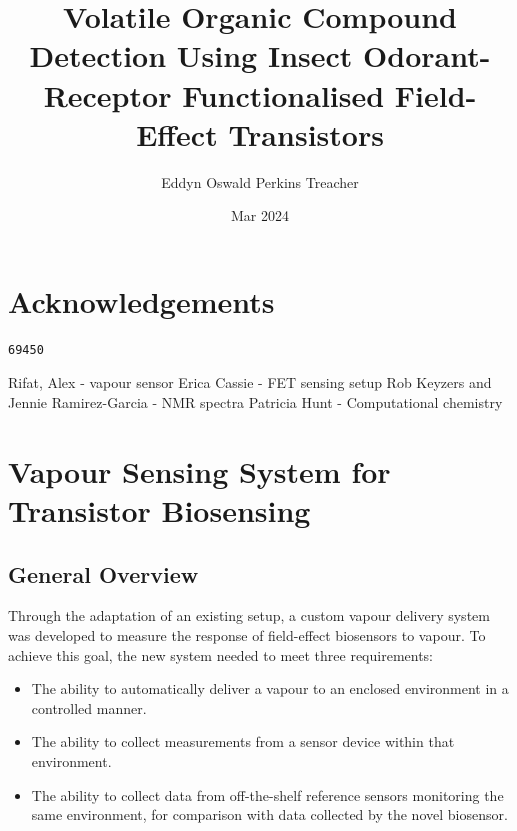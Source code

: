 \documentclass[
  a4paper,
]{scrbook}
\title{Volatile Organic Compound Detection Using Insect Odorant-Receptor
Functionalised Field-Effect Transistors}
\author{Eddyn Oswald Perkins Treacher}
\date{Mar 2024}
\renewcommand*\contentsname{Table of contents}
\newcommand\contentsname{Table of contents}
\begin{document}
\frontmatter
\maketitle
\ifdefined\Shaded\renewenvironment{Shaded}{\begin{tcolorbox}[borderline west={3pt}{0pt}{shadecolor}, sharp corners, enhanced, interior hidden, breakable, boxrule=0pt, frame hidden]}{\end{tcolorbox}}\fi

\renewcommand*\contentsname{Table of contents}
{
\setcounter{tocdepth}{2}
\tableofcontents
}
\mainmatter
{}

\hypertarget{acknowledgements}{%
\chapter*{Acknowledgements}\label{acknowledgements}}


\begin{verbatim}
69450
\end{verbatim}

Rifat, Alex - vapour sensor Erica Cassie - FET sensing setup Rob Keyzers
and Jennie Ramirez-Garcia - NMR spectra Patricia Hunt - Computational
chemistry


\hypertarget{sec-vapour-sensing-biosensors}{%
\chapter{Vapour Sensing System for Transistor
Biosensing}\label{sec-vapour-sensing-biosensors}}

\hypertarget{general-overview}{%
\section{General Overview}\label{general-overview}}

Through the adaptation of an existing setup, a custom vapour delivery
system was developed to measure the response of field-effect biosensors
to vapour. To achieve this goal, the new system needed to meet three
requirements:

\begin{itemize}
\item
  The ability to automatically deliver a vapour to an enclosed
  environment in a controlled manner.
\item
  The ability to collect measurements from a sensor device within that
  environment.
\item
  The ability to collect data from off-the-shelf reference sensors
  monitoring the same environment, for comparison with data collected by
  the novel biosensor.
\end{itemize}
\end{document}
